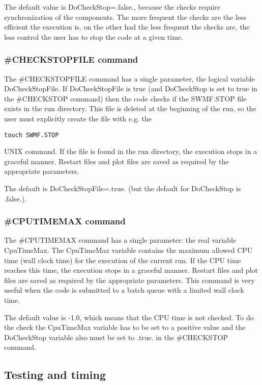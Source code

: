 The default value is DoCheckStop=.false., because the checks require
synchronization of the components. The more frequent the checks
are the less efficient the execution is, on the other had the
less frequent the checks are, the less control the user has to stop
the code at a given time.

\subsubsection{\#CHECKSTOPFILE command}

The \#CHECKSTOPFILE command has a single parameter, the logical variable
DoCheckStopFile. If DoCheckStopFile is true (and DoCheckStop is set
to true in the \#CHECKSTOP command) then the code checks if the
SWMF.STOP file exists in the run directory. This file is deleted at
the beginning of the run, so the user must explicitly create the file
with e.g. the 
\begin{verbatim}
touch SWMF.STOP
\end{verbatim}
UNIX command. If the file is found in the run directory,
the execution stops in a graceful manner. 
Restart files and plot files are saved as required by the 
appropriate parameters.

The default is DoCheckStopFile=.true. (but the default for DoCheckStop
is .false.).

\subsubsection{\#CPUTIMEMAX command}

The \#CPUTIMEMAX command has a single parameter: the real variable CpuTimeMax.
The CpuTimeMax variable contains the maximum allowed CPU time (wall clock
time) for the execution of the current run. If the CPU time reaches
this time, the execution stops in a graceful manner. 
Restart files and plot files are saved as required by the 
appropriate parameters.
This command is very useful when the code is submitted to a batch
queue with a limited wall clock time.

The default value is -1.0, which means that the CPU time is not checked.
To do the check the CpuTimeMax variable has to be set to a positive
value and the DoCheckStop variable also must be set to .true. in the 
\#CHECKSTOP command.

\subsection{Testing and timing}

